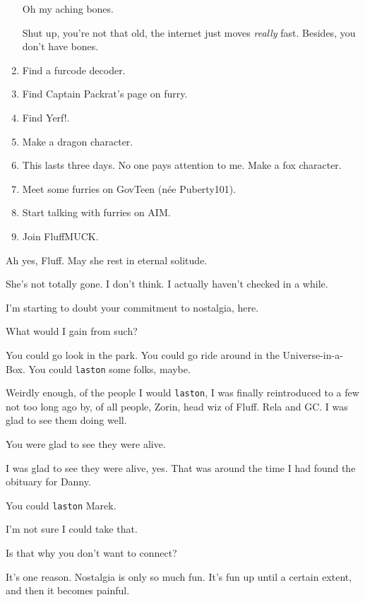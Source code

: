 \begin{leftcolumn}
\begin{enumerate}
  \begin{ally}
  Oh my aching bones.
  \end{ally}
  Shut up, you're not that old, the internet just moves \emph{really} fast. Besides, you don't have bones.
\item
  Find a furcode decoder.
\item
  Find Captain Packrat's page on furry.
\item
  Find Yerf!.
\item
  Make a dragon character.
\item
  This lasts three days. No one pays attention to me. Make a fox character.
\item
  Meet some furries on GovTeen (née Puberty101).
\item
  Start talking with furries on AIM.
\item
  Join FluffMUCK.
\end{enumerate}

\begin{ally}
Ah yes, Fluff. May she rest in eternal solitude.
\end{ally}
She's not totally gone. I don't think. I actually haven't checked in a while.

\begin{ally}
I'm starting to doubt your commitment to nostalgia, here.
\end{ally}
What would I gain from such?

\begin{ally}
You could go look in the park. You could go ride around in the Universe-in-a-Box. You could \texttt{laston} some folks, maybe.
\end{ally}
Weirdly enough, of the people I would \texttt{laston}, I was finally reintroduced to a few not too long ago by, of all people, Zorin, head wiz of Fluff. Rela and GC. I was glad to see them doing well.

\begin{ally}
You were glad to see they were alive.
\end{ally}
I was glad to see they were alive, yes. That was around the time I had found the obituary for Danny.

\begin{ally}
You could \texttt{laston} Marek.
\end{ally}
I'm not sure I could take that.

\begin{ally}
Is that why you don't want to connect?
\end{ally}
It's one reason. Nostalgia is only so much fun. It's fun up until a certain extent, and then it becomes painful.


\end{leftcolumn}
